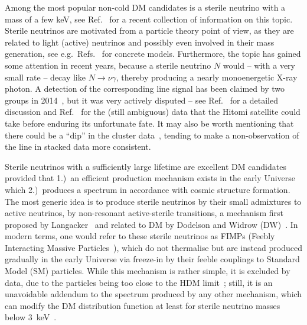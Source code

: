 Among the most popular non-cold DM candidates is a sterile neutrino with a mass of a few keV, see Ref.~\cite{Adhikari:2016bei} for a recent collection of information on this topic. Sterile neutrinos are motivated from a particle theory point of view, as they are related to light (active) neutrinos and possibly even involved in their mass generation, see e.g.\ Refs.~\cite{Ky:2005yq,Dias:2005yh,Shaposhnikov:2006nn,Cogollo:2009yi,Dias:2010vt,Lindner:2010wr,Kusenko:2010ik,Merle:2011yv,Araki:2011zg,Adulpravitchai:2011rq,Zhang:2011vh,Robinson:2012wu,Mavromatos:2012cc,Dev:2012sg,Takahashi:2013eva,Borah:2013waa,Merle:2013gea,Robinson:2014bma} for concrete models. Furthermore, the topic has gained some attention in recent years, because a sterile neutrino $N$ would -- with a very small rate -- decay like $N\to \nu \gamma$, thereby producing a nearly monoenergetic X-ray photon. A detection of the corresponding line signal has been claimed by two groups in 2014~\cite{Bulbul:2014sua,Boyarsky:2014jta}, but it was very actively disputed -- see Ref.~\cite{Adhikari:2016bei} for a detailed discussion and Ref.~\cite{Aharonian:2016gzq} for the (still ambiguous) data that the Hitomi satellite could take before enduring its unfortunate fate. It may also be worth mentioning that there could be a ``dip'' in the cluster data~\cite{Conlon:2016lxl}, tending to make a non-observation of the line in stacked data more consistent.

Sterile neutrinos with a sufficiently large lifetime are excellent DM candidates provided that 1.)~an efficient production mechanism exists in the early Universe which 2.)~produces a spectrum in accordance with cosmic structure formation. The most generic idea is to produce sterile neutrinos by their small admixtures to active neutrinos, by non-resonant active-sterile transitions, a mechanism first proposed by Langacker~\cite{Langacker:1989sv} and related to DM by Dodelson and Widrow (DW)~\cite{Dodelson:1993je}. In modern terms, one would refer to these sterile neutrinos as FIMPs (Feebly Interacting Massive Particles~\cite{Hall:2009bx}), which do not thermalise but are instead produced gradually in the early Universe via freeze-in by their feeble couplings to Standard Model (SM) particles. While this mechanism is rather simple, it is excluded by data, due to the particles being too close to the HDM limit~\cite{Seljak:2006qw,Viel:2013apy}; still, it is an unavoidable addendum to the spectrum produced by any other mechanism, which can modify the DM distribution function at least for sterile neutrino masses below $3$~keV~\cite{Merle:2015vzu}.

